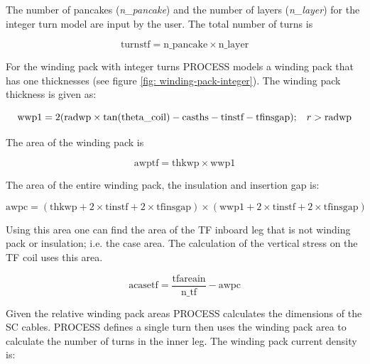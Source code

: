 \documentclass[hidelinks]{article}
\numberwithin{equation}{section}
\begin{document}
    The number of pancakes (\emph{n\_pancake}) and the number of layers (\emph{n\_layer}) 
    for the integer turn model are input by the user. The total number of turns is
    
    \begin{equation}\label{eq: turnstf-int}
        \text{turnstf} = \text{n\_pancake} \times \text{n\_layer}
    \end{equation}

    \noi For the winding pack with integer turns PROCESS models a winding pack 
    that has one thicknesses (see figure \ref{fig: winding-pack-integer}). The winding 
    pack thickness is given as:

    \begin{equation}\label{eq: wwp1-int}
    \text{wwp1} = 2(\text{radwp}\times \tan(\text{theta\_coil}) - \text{casths} - \text{tinstf} 
    - \text{tfinsgap}); \hspace{0.3cm} r > \text{radwp}
    \end{equation}

    \noi The area of the winding pack is

    \begin{equation}\label{eq: awptf-int}
    \text{awptf} = \text{thkwp} \times \text{wwp1}
    \end{equation}

    \noi The area of the entire winding pack, the insulation and insertion gap is:

    \begin{equation}\label{eq: awpc-int}
    \text{awpc} = (\text{thkwp} + 2\times \text{tinstf} + 2\times \text{tfinsgap}) 
    \times (\text{wwp1} + 2\times \text{tinstf} + 2\times \text{tfinsgap})
    \end{equation}

    \noi Using this area one can find the area of the TF inboard leg that 
    is not winding pack or insulation; i.e. the case area. The calculation of the 
    vertical stress on the TF coil uses this area.

    \begin{equation}\label{eq: acasetf-int}
    \text{acasetf} = \frac{\text{tfareain}}{\text{n\_tf}} - \text{awpc}
    \end{equation}

    \noi Given the relative winding pack areas PROCESS calculates the dimensions of 
    the SC cables. PROCESS defines a single turn then uses the winding pack area to 
    calculate the number of turns in the inner leg. The winding pack current density is:
\end{document}
